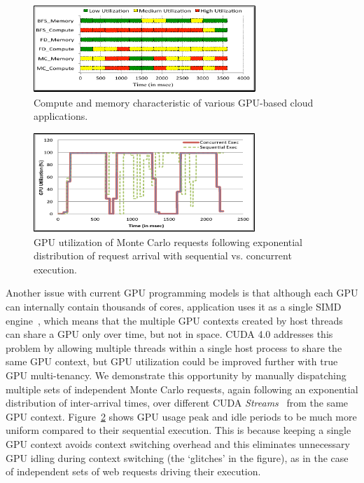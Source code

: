 \begin{figure}[t]
\centering
\includegraphics[width=0.75\textwidth,height=\textheight,keepaspectratio]{figures/cloud-workload.pdf}
\caption{Compute and memory characteristic of various GPU-based cloud applications. }
\label{fig:cloud-workload}
\end{figure}

\begin{figure}[t]
\centering
\includegraphics[width=0.75\textwidth,height=\textheight,keepaspectratio]{figures/GPU-utilization.pdf}
\caption{GPU utilization of Monte Carlo requests following exponential distribution of request arrival with sequential vs. concurrent execution. }
\label{fig:GPU-utilization}
\end{figure}

Another issue with current GPU programming models is that although each GPU can internally contain thousands of cores, application uses it as a single SIMD engine~\cite{GPU25}, which means that the multiple GPU contexts created by host threads can share a GPU only over time, but not in space. CUDA 4.0 addresses this problem by allowing multiple threads within a single host process to share the same GPU context, but GPU utilization could be improved further with true GPU multi-tenancy. We demonstrate this opportunity by manually dispatching multiple sets of independent Monte Carlo requests, again following an exponential distribution of inter-arrival times, over different CUDA \textit{Streams}~\cite{cuda7} from the same GPU context. Figure~\ref{fig:GPU-utilization} shows GPU usage peak and idle periods to be much more uniform compared to their sequential execution. This is because keeping a single GPU context avoids context switching overhead and this eliminates unnecessary GPU idling during context switching (the `glitches' in the figure), as in the case of independent sets of web requests driving their execution.

